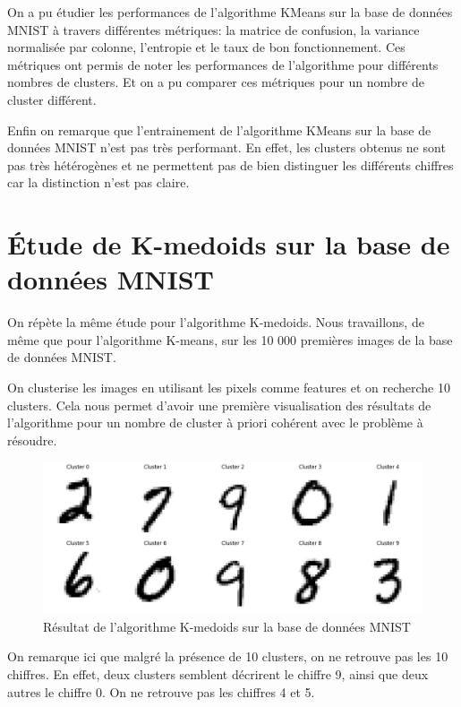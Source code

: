 \documentclass[french,a4paper,18pt]{article}
\begin{document}
On a pu étudier les performances de l'algorithme KMeans sur la base de données MNIST à travers
différentes métriques: la matrice de confusion, la variance normalisée par colonne, l'entropie et le taux de bon fonctionnement.
Ces métriques ont permis de noter les performances de l'algorithme pour différents nombres de clusters.
Et on a pu comparer ces métriques pour un nombre de cluster différent.

Enfin on remarque que l'entrainement de l'algorithme KMeans sur la base de données MNIST n'est pas très performant.
En effet, les clusters obtenus ne sont pas très hétérogènes et ne permettent pas de bien distinguer les différents chiffres
car la distinction n'est pas claire.


\section{Étude de K-medoids sur la base de données MNIST}

On répète la même étude pour l'algorithme K-medoids. Nous travaillons, de même que pour l'algorithme K-means, 
sur les 10 000 premières images de la base de données MNIST.

On clusterise les images en utilisant les pixels comme features et on recherche 10 clusters.
Cela nous permet d'avoir une première visualisation des résultats de l'algorithme pour un nombre 
de cluster à priori cohérent avec le problème à résoudre.

\begin{figure}[h!]
    \centering
    \includegraphics[scale=0.25]{../images/mnist_kmedoids_ten_clusters.png}
    \caption{Résultat de l'algorithme K-medoids sur la base de données MNIST}\label{fig:mnist_kmedoids}
\end{figure}

On remarque ici que malgré la présence de 10 clusters, on ne retrouve pas les 10 chiffres.
En effet, deux clusters semblent décrirent le chiffre 9, ainsi que deux autres le chiffre 0.
On ne retrouve pas les chiffres 4 et 5.
\end{document}
